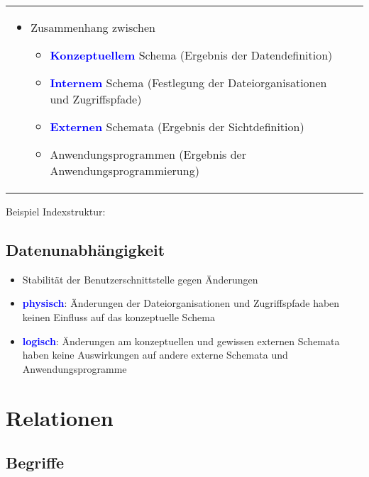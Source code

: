 \documentclass{scrartcl}
\newcommand{\key}[1]{{\textcolor{blue}{\textbf{#1}}}}
\begin{document}
\begin{tabular}{ll}
	\begin{minipage}{.6\textwidth}
		\begin{itemize}
			\itemsep0em
			\item Zusammenhang zwischen
			\begin{itemize}
				\item \key{Konzeptuellem} Schema (Ergebnis der Datendefinition)
				\item \key{Internem} Schema (Festlegung der Dateiorganisationen und Zugriffspfade)
				\item \key{Externen} Schemata (Ergebnis der Sichtdefinition)
				\item Anwendungsprogrammen (Ergebnis der Anwendungsprogrammierung)
			\end{itemize}
		\end{itemize}
	\end{minipage}
	&
	\begin{minipage}{.5\textwidth}
	\end{minipage}
	\\
\end{tabular}

Beispiel Indexstruktur: \\

\subsection{Datenunabhängigkeit}

\begin{itemize}
	\itemsep0em
	\item Stabilität der Benutzerschnittstelle gegen Änderungen
	\item \key{physisch}: Änderungen der Dateiorganisationen und Zugriffspfade haben keinen Einfluss auf das konzeptuelle Schema
	\item \key{logisch}: Änderungen am konzeptuellen und gewissen externen Schemata haben keine Auswirkungen auf andere externe	Schemata und Anwendungsprogramme
\end{itemize}

\section{Relationen}

\subsection{Begriffe}
\end{document}
